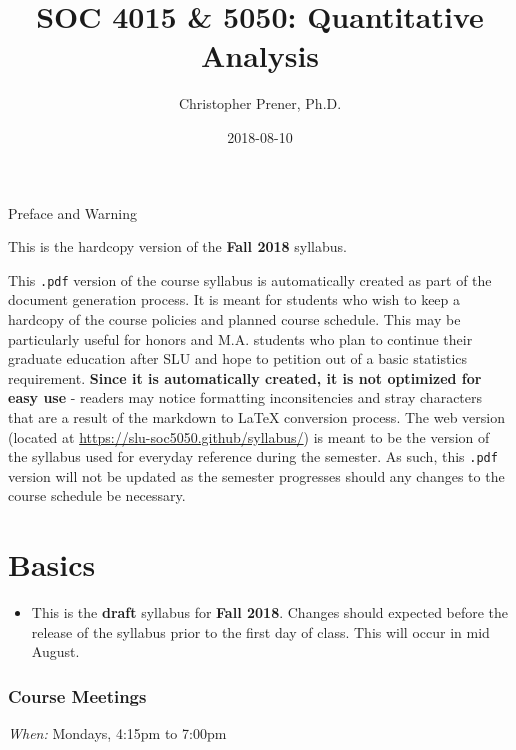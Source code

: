\documentclass[]{book}
\title{SOC 4015 \& 5050: Quantitative Analysis}
\author{Christopher Prener, Ph.D.}
\date{2018-08-10}
\newenvironment{rmdblock}[1]
  {\begin{shaded*}
  \begin{itemize}
  \renewcommand{\labelitemi}{
    \raisebox{-.7\height}[0pt][0pt]{
      {\setkeys{Gin}{width=3em,keepaspectratio}\texttt{[image: images/\#1]}}
    }
  }
  \item
  }
  {
  \end{itemize}
  \end{shaded*}
  }
\newenvironment{rmdwarning}
  {\begin{rmdblock}{warning}}
  {\end{rmdblock}}
\theoremstyle{definition}
\theoremstyle{definition}
\theoremstyle{definition}
\theoremstyle{remark}
\begin{document}
\maketitle

\begin{center}
{\huge Preface and Warning} \\
\end{center}
\vspace{5mm}
This is the hardcopy version of the \textbf{Fall 2018} syllabus.
\vspace{5mm}
\par \noindent This \texttt{.pdf} version of the course syllabus is automatically created as part of the document generation process. It is meant for students who wish to keep a hardcopy of the course policies and planned course schedule. This may be particularly useful for honors and M.A. students who plan to continue their graduate education after SLU and hope to petition out of a basic statistics requirement. \textbf{Since it is automatically created, it is not optimized for easy use} - readers may notice formatting inconsitencies and stray characters that are a result of the markdown to \LaTeX{} conversion process. The web version (located at \href{https://slu-soc5050.github/syllabus/}{https://slu-soc5050.github/syllabus/}) is meant to be the version of the syllabus used for everyday reference during the semester. As such, this \texttt{.pdf} version will not be updated as the semester progresses should any changes to the course schedule be necessary.

\hypertarget{basics}{%
\chapter*{Basics}\label{basics}}

\begin{rmdwarning}
This is the \textbf{draft} syllabus for \textbf{Fall 2018}. Changes
should expected before the release of the syllabus prior to the first
day of class. This will occur in mid August.
\end{rmdwarning}

\hypertarget{course-meetings}{%
\subsection*{Course Meetings}\label{course-meetings}}

\emph{When:} Mondays, 4:15pm to 7:00pm
\end{document}
